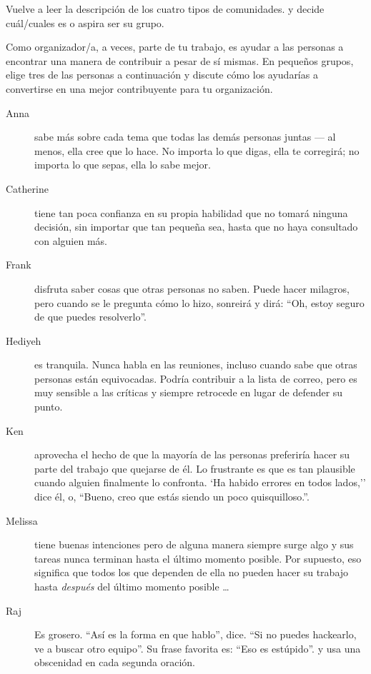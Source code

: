 
Vuelve a leer la descripción de los cuatro tipos de comunidades.
y decide cuál/cuales es o aspira ser su grupo.


Como organizador/a,
a veces, parte de tu trabajo, es ayudar a las personas a encontrar una manera de contribuir a pesar de sí mismas.
En pequeños grupos,
elige tres de las personas a continuación
y discute cómo los ayudarías a convertirse en una mejor contribuyente para tu organización.

\begin{description}

\item[Anna]
  sabe más sobre cada tema que todas las demás personas juntas --- al menos,
  ella cree que lo hace.
  No importa lo que digas,
  ella te corregirá;
  no importa lo que sepas, ella lo sabe mejor.
	
\item[Catherine]
  tiene tan poca confianza en su propia habilidad
  que no tomará ninguna decisión,
  sin importar que tan pequeña sea,
  hasta que no haya consultado con alguien más.

\item[Frank]
  disfruta saber cosas que otras personas no saben.
  Puede hacer milagros,
  pero cuando se le pregunta cómo lo hizo,
  sonreirá y dirá:
  ``Oh, estoy seguro de que puedes resolverlo''.

\item[Hediyeh]
  es tranquila.
  Nunca habla en las reuniones,
  incluso cuando sabe que otras personas están equivocadas.
  Podría contribuir a la lista de correo,
  pero es muy sensible a las críticas
  y siempre retrocede en lugar de defender su punto.

\item[Ken]
  aprovecha el hecho de que la mayoría de las personas preferiría hacer su parte del trabajo
  que quejarse de él.
  Lo frustrante es que es tan plausible cuando alguien finalmente lo confronta.
  `Ha habido errores en todos lados,''
  dice él,
  o, ``Bueno, creo que estás siendo un poco quisquilloso.''.

\item[Melissa]
  tiene buenas intenciones
  pero de alguna manera siempre surge algo
  y sus tareas nunca terminan hasta el último momento posible.
  Por supuesto,
  eso significa que todos los que dependen de ella no pueden hacer su trabajo
  hasta \emph{después} del último momento posible {\ldots}
  
\item[Raj]
  Es grosero.
  ``Así es la forma en que hablo'', dice.
  ``Si no puedes hackearlo, ve a buscar otro equipo''.
  Su frase favorita es: ``Eso es estúpido''.
  y usa una obscenidad en cada segunda oración.

\end{description}

